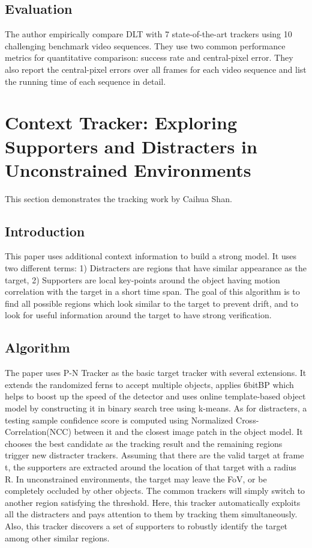 \documentclass{article}
\begin{document}
\subsection{Evaluation}

The author empirically compare DLT with 7 state-of-the-art trackers using 10 challenging benchmark video sequences. They use two common performance metrics for quantitative comparison: success rate and central-pixel error. They also report the central-pixel errors over all frames for each video sequence and list the running time of each sequence in detail.

\section{Context Tracker: Exploring Supporters and Distracters in Unconstrained Environments}
This section demonstrates the tracking work by Caihua Shan.
\subsection{Introduction}
    This paper uses additional context information to build a strong model. It uses two different terms: 1) Distracters are regions that have similar appearance as the target, 2) Supporters are local key-points around the object having motion correlation with the target in a short time span. The goal of this algorithm is to find all possible regions which look similar to the target to prevent drift, and to look for useful information around the target to have strong verification.
\subsection{Algorithm}
    The paper uses P-N Tracker as the basic target tracker with several extensions. It extends the randomized ferns to accept multiple objects, applies 6bitBP which helps to boost up the speed of the detector and uses online template-based object model by constructing it in binary search tree using k-means.
    \newline
    As for distracters, a testing sample confidence score is computed using Normalized Cross-Correlation(NCC) between it and the closest image patch in the object model. It chooses the best candidate as the tracking result and the remaining regions trigger new distracter trackers.
    \newline
    Assuming that there are the valid target at frame t, the supporters are extracted around the location of that target with a radius R.
    \newline
    In unconstrained environments, the target may leave the FoV, or be completely occluded by other objects. The common trackers will simply switch to another region satisfying the threshold. Here, this tracker automatically exploits all the distracters and pays attention to them by tracking them simultaneously. Also, this tracker discovers a set of supporters to robustly identify the target among other similar regions.
\end{document}
